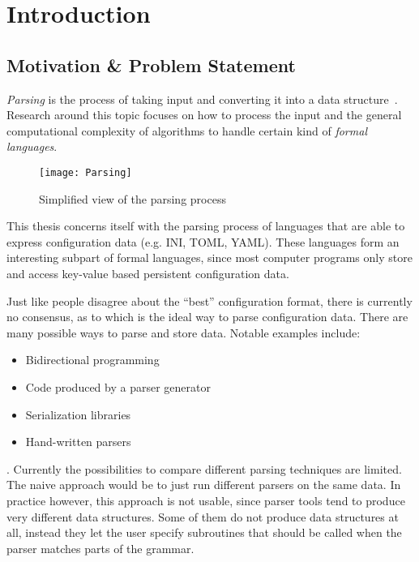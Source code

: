 \chapter{Introduction}

\section{Motivation \& Problem Statement}

\emph{Parsing} is the process of taking input and converting it into a data structure~\cite{wikipedia2016Parser, grune2007parsing}. Research around this topic focuses on how to process the input and the general computational complexity of algorithms to handle certain kind of \emph{formal languages}.

\begin{figure}[H]
  \centering
    \texttt{[image: Parsing]}
  \caption{Simplified view of the parsing process}
\end{figure}

This thesis concerns itself with the parsing process of languages that are able to express configuration data (e.g. INI, TOML, YAML). These languages form an interesting subpart of formal languages, since most computer programs only store and access key-value based persistent configuration data.

Just like people disagree about the “best” configuration format, there is currently no consensus, as to which is the ideal way to parse configuration data. There are many possible ways to parse and store data. Notable examples include:

\begin{itemize}
  \item Bidirectional programming~\cite{foster2005combinators, bohannon2006relational, lutterkort2008augeas, ko2016bigul, raab2016improving}
  \item Code produced by a parser generator~\cite{denny2008ielr, parr2014adaptive, warth2016modular, bates2017aprt}
  \item Serialization libraries~\cite{sumaray2012cds, pacini2015performance}
  \item Hand-written parsers~\cite{myers2008cparser, bendersky2012clang}
\end{itemize}

. Currently the possibilities to compare different parsing techniques are limited. The naive approach would be to just run different parsers on the same data. In practice however, this approach is not usable, since parser tools tend to produce very different data structures. Some of them do not produce data structures at all, instead they let the user specify subroutines that should be called when the parser matches parts of the grammar.

